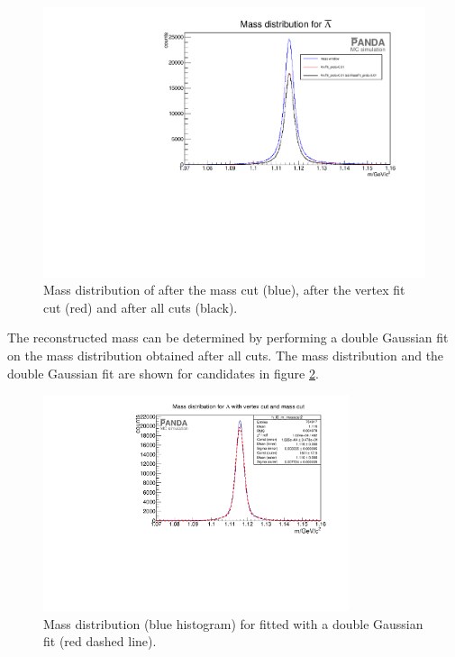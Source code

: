 		\begin{figure}
			\centering
				\includegraphics[width=1.1\textwidth]{./plots/antilambda0/antiLambda0_m_diffcuts.pdf}
			\caption{\propose Mass distribution of \alam after the mass cut (blue), after the vertex fit cut (red) and after all cuts (black).}
			\label{fig:antilambda0_massdiffcuts}
		\end{figure}
		
		The reconstructed mass can be determined by performing a double Gaussian fit on the mass distribution obtained after all cuts.
		The mass distribution and the double Gaussian fit are shown for \lam candidates in figure \ref{fig:lambda0_massfit}.
		
		\begin{figure}
			\centering
				\includegraphics[width=0.8\textwidth]{./plots/lambda0/lambda0_m_masscut2.pdf}
			\caption{\propose Mass distribution (blue histogram) for \lam fitted with a double Gaussian fit (red dashed line).}
			\label{fig:lambda0_massfit}
		\end{figure}
		
